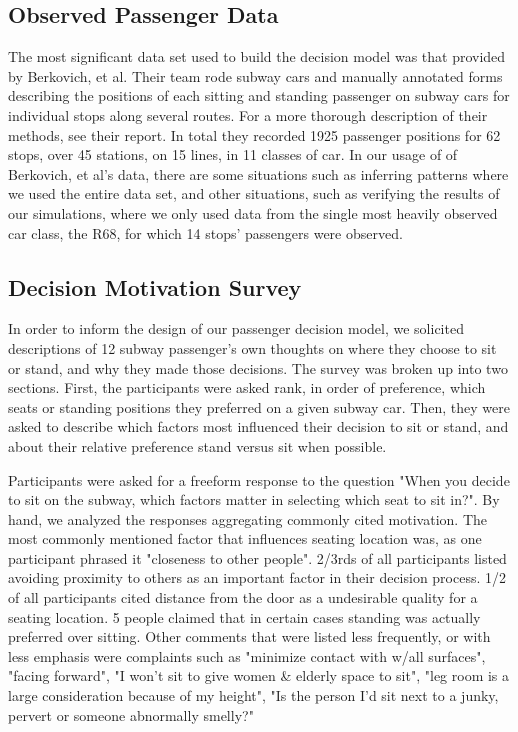 \documentclass{acm_proc_article-sp}
\begin{document}
\subsection{Observed Passenger Data}
The most significant data set used to build the decision model was that provided by Berkovich, et al. Their team rode subway cars and manually annotated forms describing the positions of each sitting and standing passenger on subway cars for individual stops along several routes. For a more thorough description of their methods, see their report\cite{berkovich2013observed}. In total they recorded 1925 passenger positions for 62 stops, over 45 stations, on 15 lines, in 11 classes of car. In our usage of of Berkovich, et al's data, there are some situations such as inferring patterns where we used the entire data set, and other situations, such as verifying the results of our simulations, where we only used data from the single most heavily observed car class, the R68, for which 14 stops' passengers were observed.

\subsection{Decision Motivation Survey}
In order to inform the design of our passenger decision model, we solicited descriptions of 12 subway passenger's own thoughts on where they choose to sit or stand, and why they made those decisions. The survey was broken up into two sections. First, the participants were asked rank, in order of preference, which seats or standing positions they preferred on a given subway car. Then, they were asked to describe which factors most influenced their decision to sit or stand, and about their relative preference stand versus sit when possible.

Participants were asked for a freeform response to the question "When you decide to sit on the subway, which factors matter in selecting which seat to sit in?". By hand, we analyzed the responses aggregating commonly cited motivation. The most commonly mentioned factor that influences seating location was, as one participant phrased it "closeness to other people". 2/3rds of all participants listed avoiding proximity to others as an important factor in their decision process. 1/2 of all participants cited distance from the door as a undesirable quality for a seating location. 5 people claimed that in certain cases standing was actually preferred over sitting. Other comments that were listed less frequently, or with less emphasis were complaints such as "minimize contact with w/all surfaces", "facing forward", "I won't sit to give women \& elderly space to sit", "leg room is a large consideration because of my height", "Is the person I'd sit next to a junky, pervert or someone abnormally smelly?"
\end{document}
